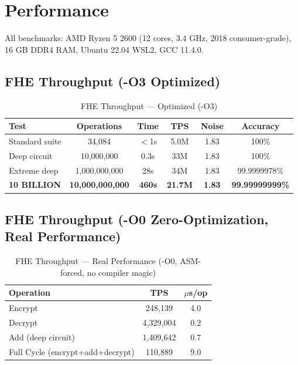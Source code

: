\documentclass[11pt,a4paper]{article}
\begin{document}
\section{Performance}

All benchmarks: AMD Ryzen 5 2600 (12 cores, 3.4 GHz, 2018 consumer-grade), 16 GB DDR4 RAM, Ubuntu 22.04 WSL2, GCC 11.4.0.

\subsection{FHE Throughput (-O3 Optimized)}

\begin{table}[h]
\centering
\begin{tabular}{|l|c|c|c|c|c|}
\hline
\textbf{Test} & \textbf{Operations} & \textbf{Time} & \textbf{TPS} & \textbf{Noise} & \textbf{Accuracy} \\
\hline
Standard suite & 34,084 & $<$1s & 5.0M & 1.83 & 100\% \\
Deep circuit & 10,000,000 & 0.3s & 33M & 1.83 & 100\% \\
Extreme deep & 1,000,000,000 & 28s & 34M & 1.83 & 99.9999978\% \\
\textbf{10 BILLION} & \textbf{10,000,000,000} & \textbf{460s} & \textbf{21.7M} & \textbf{1.83} & \textbf{99.99999999\%} \\
\hline
\end{tabular}
\caption{FHE Throughput — Optimized (-O3)}
\end{table}

\subsection{FHE Throughput (-O0 Zero-Optimization, Real Performance)}

\begin{table}[h]
\centering
\begin{tabular}{|l|c|c|}
\hline
\textbf{Operation} & \textbf{TPS} & \textbf{$\mu$s/op} \\
\hline
Encrypt & 248,139 & 4.0 \\
Decrypt & 4,329,004 & 0.2 \\
Add (deep circuit) & 1,409,642 & 0.7 \\
Full Cycle (encrypt+add+decrypt) & 110,889 & 9.0 \\
\hline
\end{tabular}
\caption{FHE Throughput — Real Performance (-O0, ASM-forced, no compiler magic)}
\end{table}
\end{document}
